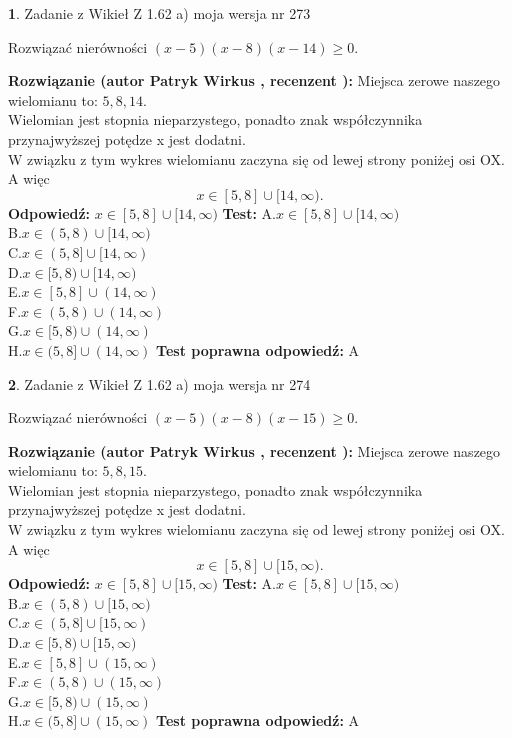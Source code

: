 \documentclass[12pt, a4paper]{article}
\theoremstyle{definition} %
\newtheorem{zad}{}
\newcommand{\zadStart}[1]{\begin{zad}#1\newline}
\newcommand{\zadStop}{\end{zad}}
\newcommand{\rozwStart}[2]{\noindent \textbf{Rozwiązanie (autor #1 , recenzent #2): }\newline}
\newcommand{\rozwStop}{\newline}
\newcommand{\odpStart}{\noindent \textbf{Odpowiedź:}\newline}
\newcommand{\odpStop}{\newline}
\newcommand{\testStart}{\noindent \textbf{Test:}\newline}
\newcommand{\testStop}{\newline}
\newcommand{\kluczStart}{\noindent \textbf{Test poprawna odpowiedź:}\newline}
\newcommand{\kluczStop}{\newline}
\begin{document}
\zadStart{Zadanie z Wikieł Z 1.62 a) moja wersja nr 273}

Rozwiązać nierówności $(x-5)(x-8)(x-14)\ge0$.
\zadStop
\rozwStart{Patryk Wirkus}{}
Miejsca zerowe naszego wielomianu to: $5, 8, 14$.\\
Wielomian jest stopnia nieparzystego, ponadto znak współczynnika przy\linebreak najwyższej potędze x jest dodatni.\\ W związku z tym wykres wielomianu zaczyna się od lewej strony poniżej osi OX. A więc $$x \in [5,8] \cup [14,\infty).$$
\rozwStop
\odpStart
$x \in [5,8] \cup [14,\infty)$
\odpStop
\testStart
A.$x \in [5,8] \cup [14,\infty)$\\
B.$x \in (5,8) \cup [14,\infty)$\\
C.$x \in (5,8] \cup [14,\infty)$\\
D.$x \in [5,8) \cup [14,\infty)$\\
E.$x \in [5,8] \cup (14,\infty)$\\
F.$x \in (5,8) \cup (14,\infty)$\\
G.$x \in [5,8) \cup (14,\infty)$\\
H.$x \in (5,8] \cup (14,\infty)$
\testStop
\kluczStart
A
\kluczStop



\zadStart{Zadanie z Wikieł Z 1.62 a) moja wersja nr 274}

Rozwiązać nierówności $(x-5)(x-8)(x-15)\ge0$.
\zadStop
\rozwStart{Patryk Wirkus}{}
Miejsca zerowe naszego wielomianu to: $5, 8, 15$.\\
Wielomian jest stopnia nieparzystego, ponadto znak współczynnika przy\linebreak najwyższej potędze x jest dodatni.\\ W związku z tym wykres wielomianu zaczyna się od lewej strony poniżej osi OX. A więc $$x \in [5,8] \cup [15,\infty).$$
\rozwStop
\odpStart
$x \in [5,8] \cup [15,\infty)$
\odpStop
\testStart
A.$x \in [5,8] \cup [15,\infty)$\\
B.$x \in (5,8) \cup [15,\infty)$\\
C.$x \in (5,8] \cup [15,\infty)$\\
D.$x \in [5,8) \cup [15,\infty)$\\
E.$x \in [5,8] \cup (15,\infty)$\\
F.$x \in (5,8) \cup (15,\infty)$\\
G.$x \in [5,8) \cup (15,\infty)$\\
H.$x \in (5,8] \cup (15,\infty)$
\testStop
\kluczStart
A
\kluczStop
\end{document}
